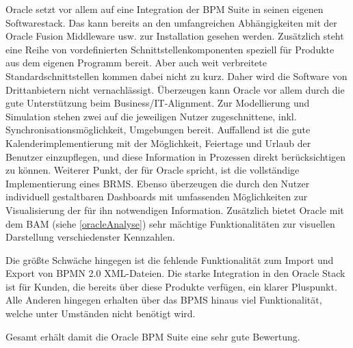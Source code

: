 Oracle setzt vor allem auf eine Integration der BPM Suite in seinen eigenen Softwarestack. Das kann bereits an den umfangreichen Abhängigkeiten mit der Oracle Fusion Middleware usw. zur Installation gesehen werden. Zusätzlich steht eine Reihe von vordefinierten Schnittstellenkomponenten speziell für Produkte aus dem eigenen Programm bereit.
Aber auch weit verbreitete Standardschnittstellen kommen dabei nicht zu kurz. Daher wird die Software von Drittanbietern nicht vernachlässigt.
Überzeugen kann Oracle vor allem durch die gute Unterstützung beim Business/IT-Alignment. Zur Modellierung und Simulation stehen zwei auf die jeweiligen Nutzer zugeschnittene, inkl. Synchronisationsmöglichkeit, Umgebungen bereit. Auffallend ist die gute Kalenderimplementierung mit der Möglichkeit, Feiertage und Urlaub der Benutzer einzupflegen, und diese Information in Prozessen direkt berücksichtigen zu können. Weiterer Punkt, der für Oracle spricht, ist die vollständige Implementierung eines \ac{BRMS}.
Ebenso überzeugen die durch den Nutzer individuell gestaltbaren Dashboards mit umfassenden Möglichkeiten zur Visualisierung der für ihn notwendigen Information. Zusätzlich bietet Oracle mit dem BAM (siehe \ref{oracleAnalyse}) sehr mächtige Funktionalitäten zur visuellen Darstellung verschiedenster Kennzahlen.

\newpage Die größte Schwäche hingegen ist die fehlende Funktionalität zum Import und Export von \ac{BPMN} 2.0 XML-Dateien. Die starke Integration in den Oracle Stack ist für Kunden, die bereits über diese Produkte verfügen, ein klarer Pluspunkt. Alle Anderen hingegen erhalten über das \ac{BPMS} hinaus viel Funktionalität, welche unter Umständen nicht benötigt wird.

\smallskip\noindent Gesamt erhält damit die Oracle BPM Suite eine sehr gute Bewertung.

